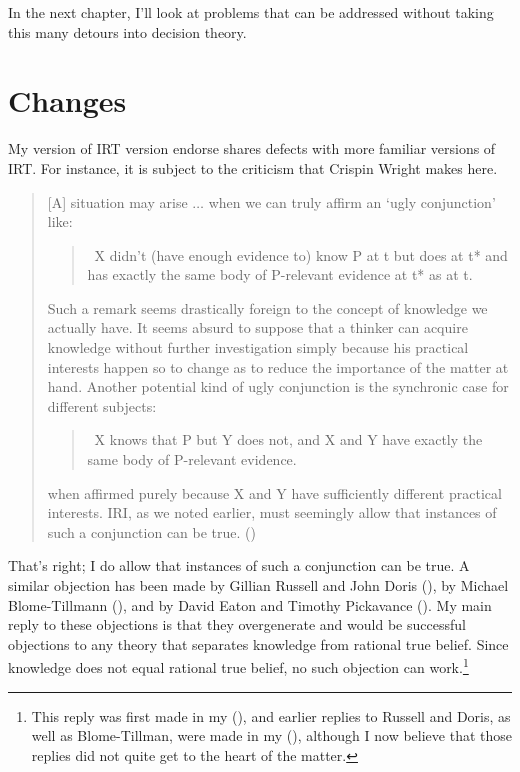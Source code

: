 \documentclass[
  12pt,
  letterpaper,
]{scrbook}
\begin{document}
In the next chapter, I'll look at problems that can be addressed without
taking this many detours into decision theory.


\chapter{Changes}\label{sec-changes}

My version of IRT version endorse shares defects with more familiar
versions of IRT. For instance, it is subject to the criticism that
Crispin Wright makes here.

\begin{quote}
{[}A{]} situation may arise \(\dots\) when we can truly affirm an `ugly
conjunction' like:

\begin{quote}
~X didn't (have enough evidence to) know P at t but does at t* and has
exactly the same body of P-relevant evidence at t* as at t.
\end{quote}

Such a remark seems drastically foreign to the concept of knowledge we
actually have. It seems absurd to suppose that a thinker can acquire
knowledge without further investigation simply because his practical
interests happen so to change as to reduce the importance of the matter
at hand. Another potential kind of ugly conjunction is the synchronic
case for different subjects:

\begin{quote}
~X knows that P but Y does not, and X and Y have exactly the same body
of P-relevant evidence.
\end{quote}

when affirmed purely because X and Y have sufficiently different
practical interests. IRI, as we noted earlier, must seemingly allow that
instances of such a conjunction can be true.
()
\end{quote}

That's right; I do allow that instances of such a conjunction can be
true. A similar objection has been made by Gillian Russell and John
Doris (), by Michael Blome-Tillmann
(), and by David Eaton and Timothy
Pickavance (). My main reply to
these objections is that they overgenerate and would be successful
objections to any theory that separates knowledge from rational true
belief. Since knowledge does not equal rational true belief, no such
objection can work.\footnote{This reply was first made in my
  (), and earlier replies to
  Russell and Doris, as well as Blome-Tillman, were made in my
  (), although I now believe
  that those replies did not quite get to the heart of the matter.}
\end{document}
